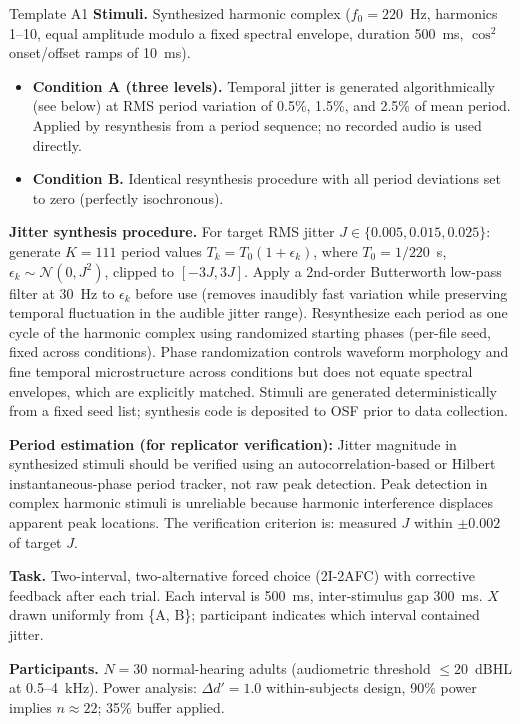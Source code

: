 \documentclass[11pt, a4paper]{article}
\begin{document}
\begin{predbox}{Template A1}
\textbf{Stimuli.}
Synthesized harmonic complex ($f_0 = 220$~Hz, harmonics 1–10, equal amplitude
modulo a fixed spectral envelope, duration 500~ms, $\cos^2$ onset/offset ramps
of 10~ms).
\begin{itemize}
  \item \textbf{Condition A (three levels).}  Temporal jitter is generated
    algorithmically (see below) at RMS period variation of 0.5\%, 1.5\%, and
    2.5\% of mean period.  Applied by resynthesis from a period sequence; no
    recorded audio is used directly.
  \item \textbf{Condition B.}  Identical resynthesis procedure with all period
    deviations set to zero (perfectly isochronous).
\end{itemize}

\textbf{Jitter synthesis procedure.}
For target RMS jitter $J \in \{0.005, 0.015, 0.025\}$: generate $K = 111$
period values $T_k = T_0(1 + \epsilon_k)$, where $T_0 = 1/220$~s,
$\epsilon_k \sim \mathcal{N}(0, J^2)$, clipped to $[-3J, 3J]$.  Apply a
2nd-order Butterworth low-pass filter at 30~Hz to $\epsilon_k$ before use
(removes inaudibly fast variation while preserving temporal fluctuation in
the audible jitter range).  Resynthesize each period as one cycle of the
harmonic complex using randomized starting phases (per-file seed, fixed
across conditions).  Phase randomization controls waveform morphology and
fine temporal microstructure across conditions but does not equate spectral
envelopes, which are explicitly matched.  Stimuli are generated deterministically
from a fixed seed list; synthesis code is deposited to OSF prior to data collection.

\textbf{Period estimation (for replicator verification):}
Jitter magnitude in synthesized stimuli should be verified using an
autocorrelation-based or Hilbert instantaneous-phase period tracker,
not raw peak detection.  Peak detection in complex harmonic stimuli is
unreliable because harmonic interference displaces apparent peak locations.
The verification criterion is: measured $J$ within $\pm 0.002$ of target $J$.

\textbf{Task.}
Two-interval, two-alternative forced choice (2I-2AFC) with corrective feedback
after each trial.  Each interval is 500~ms, inter-stimulus gap 300~ms.
$X$ drawn uniformly from \{A, B\}; participant indicates which interval contained
jitter.

\textbf{Participants.}
$N = 30$ normal-hearing adults (audiometric threshold $\leq 20$~dBHL at 0.5–4~kHz).
Power analysis: $\Delta d' = 1.0$ within-subjects design, 90\% power implies
$n \approx 22$; 35\% buffer applied.


\end{predbox}
\end{document}
